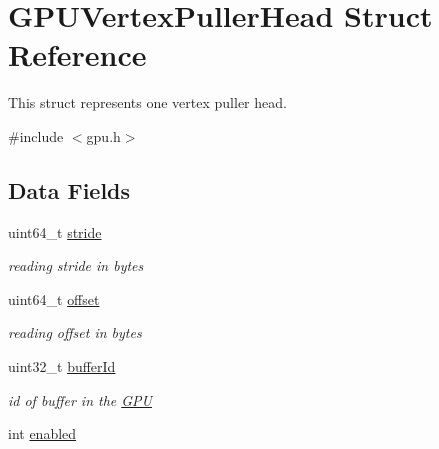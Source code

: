 \hypertarget{structGPUVertexPullerHead}{}\section{G\+P\+U\+Vertex\+Puller\+Head Struct Reference}
\label{structGPUVertexPullerHead}


This struct represents one vertex puller head.  




{\ttfamily \#include $<$gpu.\+h$>$}

\subsection*{Data Fields}
\begin{DoxyCompactItemize}
\item 
\mbox{\label{structGPUVertexPullerHead_a719b2c0cca617b922247356b3dd95477}} 
uint64\+\_\+t \hyperlink{structGPUVertexPullerHead_a719b2c0cca617b922247356b3dd95477}{stride}
\begin{DoxyCompactList}\small\item\em reading stride in bytes \end{DoxyCompactList}\item 
\mbox{\label{structGPUVertexPullerHead_ada8bcc93d4c6ebf324cfb5eb9e16dff0}} 
uint64\+\_\+t \hyperlink{structGPUVertexPullerHead_ada8bcc93d4c6ebf324cfb5eb9e16dff0}{offset}
\begin{DoxyCompactList}\small\item\em reading offset in bytes \end{DoxyCompactList}\item 
\mbox{\label{structGPUVertexPullerHead_aad295180748f7a755a407d46dc5fa491}} 
uint32\+\_\+t \hyperlink{structGPUVertexPullerHead_aad295180748f7a755a407d46dc5fa491}{buffer\+Id}
\begin{DoxyCompactList}\small\item\em id of buffer in the \hyperlink{structGPU}{G\+PU} \end{DoxyCompactList}\item 
\mbox{\label{structGPUVertexPullerHead_af0e62aaa41d6d4e134fef1a02624a592}} 
int \hyperlink{structGPUVertexPullerHead_af0e62aaa41d6d4e134fef1a02624a592}{enabled}

\end{DoxyCompactItemize}
